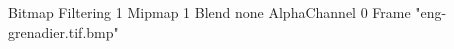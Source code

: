 {Bitmap
	{Filtering 1}
	{Mipmap 1}
	{Blend none}
	{AlphaChannel 0}
	{Frame "eng-grenadier.tif.bmp"}
}
